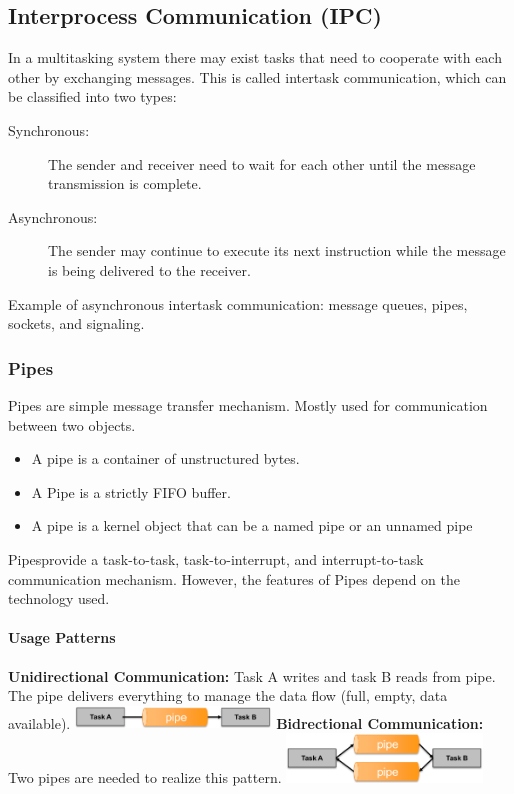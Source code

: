 \subsection{Interprocess Communication (IPC)}
In a multitasking system there may exist tasks that need to cooperate with each other by exchanging messages.
This is called intertask communication, which can be classified into two types:
\begin{description}
	\item[Synchronous:] The sender and receiver need to wait for each other until the message transmission is complete.
	\item[Asynchronous:] The sender may continue to execute its next instruction while the message is being delivered to the receiver.
\end{description}
Example of asynchronous intertask communication: message queues, pipes, sockets, and signaling.

\subsubsection{Pipes}
Pipes are simple message transfer mechanism.
Mostly used for communication between two objects.
\begin{itemize}
	\item A pipe is a container of unstructured bytes.
	\item A Pipe is a strictly FIFO buffer.
	\item A pipe is a kernel object that can be a named pipe or an unnamed pipe
\end{itemize}
\glqq{}Pipes\grqq provide a task-to-task, task-to-interrupt, and interrupt-to-task communication mechanism.
However, the features of Pipes depend on the technology used.

\paragraph{Usage Patterns}
\begin{paracol}{2}
	\textbf{Unidirectional Communication:} Task A writes and task B reads from pipe.
	The pipe delivers everything to manage the data flow (full, empty, data available).
	\switchcolumn
	\includegraphics[width=0.39\textwidth]{images/Concurrency/uni_pipe.png}
	\switchcolumn
	\textbf{Bidrectional Communication:} Two pipes are needed to realize this pattern.
	\switchcolumn
	\includegraphics[width=0.39\textwidth]{images/Concurrency/bi_pipe.png}
\end{paracol}


